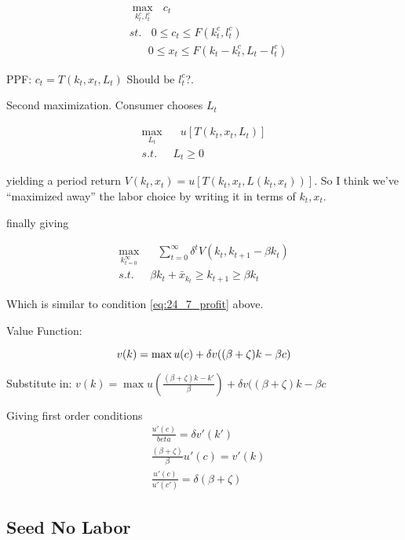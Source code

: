 \documentclass[11pt]{article}
\begin{document}
  \begin{align}
    &\max_{k^c_t, l^c_t}  \ \ \ c_t\\
    &st. \ \ \ \ 0 \leq c_t \leq F(k_t^c, l_t^c)\\
    & \ \ \ \, \ \ \ \ 0 \leq x_t \leq F(k_t - k_t^c, L_t - l_t^c)
  \end{align}

  PPF: $c_t = T(k_t, x_t, L_t)$ Should be $l^c_t$?.

  Second maximization.  Consumer chooses $L_t$

  \begin{align}
    \max_{L_t} & \ \ \  u[T(k_t, x_t, L_t)] \\
    s.t. \ \ \ & L_t \geq 0
  \end{align}

  yielding a period return $V(k_t, x_t) = u[T(k_t, x_t, L(k_t, x_t))]$.  So I think we've ``maximized away'' the labor choice by writing it in terms of $k_t, x_t$.

  finally giving

  \begin{align}
    \max_{k_{t=0}^\infty} & \ \ \ \sum_{t=0}^{\infty} \delta^t V(k_t, k_{t+1} - \beta k_t)\\
    s.t. \ \ \ & \beta k_t + \bar{x}_{k_t} \geq k_{t+1} \geq \beta k_t
  \end{align}

  Which is similar to condition \ref{eq:24_7_profit} above.
  
  Value Function:

  \begin{equation}
    v(k) = \max u(c) + \delta v((\beta + \zeta)k - \beta c)\\
  \end{equation}
  
  Substitute in:
    $v(k) = \max u(\frac{(\beta + \zeta)k - k'}{\beta}) + \delta v((\beta + \zeta)k - \beta c$
    
  Giving first order conditions
  \begin{align}
    &\frac{u'(c)}{beta} = \delta v'(k')\\
    &\frac{(\beta + \zeta)}{\beta} u'(c) = v'(k)\\
    &\frac{u'(c)}{u'(c')} = \delta(\beta + \zeta)
  \end{align}

\subsection{Seed No Labor}
\label{sub:seed_no_labor}
\end{document}
